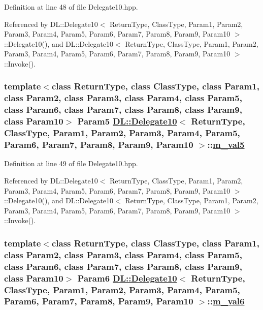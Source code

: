 Definition at line 48 of file Delegate10.hpp.

Referenced by DL::Delegate10$<$ Return\-Type, Class\-Type, Param1, Param2, Param3, Param4, Param5, Param6, Param7, Param8, Param9, Param10 $>$::Delegate10(), and DL::Delegate10$<$ Return\-Type, Class\-Type, Param1, Param2, Param3, Param4, Param5, Param6, Param7, Param8, Param9, Param10 $>$::Invoke().\hypertarget{classDL_1_1Delegate10_r6}{
\subsubsection[m\_\-val5]{\setlength{\rightskip}{0pt plus 5cm}template$<$class Return\-Type, class Class\-Type, class Param1, class Param2, class Param3, class Param4, class Param5, class Param6, class Param7, class Param8, class Param9, class Param10$>$ Param5 \hyperlink{classDL_1_1Delegate10}{DL::Delegate10}$<$ Return\-Type, Class\-Type, Param1, Param2, Param3, Param4, Param5, Param6, Param7, Param8, Param9, Param10 $>$::\hyperlink{classDL_1_1Delegate10_r6}{m\_\-val5}}}
\label{classDL_1_1Delegate10_r6}




Definition at line 49 of file Delegate10.hpp.

Referenced by DL::Delegate10$<$ Return\-Type, Class\-Type, Param1, Param2, Param3, Param4, Param5, Param6, Param7, Param8, Param9, Param10 $>$::Delegate10(), and DL::Delegate10$<$ Return\-Type, Class\-Type, Param1, Param2, Param3, Param4, Param5, Param6, Param7, Param8, Param9, Param10 $>$::Invoke().\hypertarget{classDL_1_1Delegate10_r7}{
\subsubsection[m\_\-val6]{\setlength{\rightskip}{0pt plus 5cm}template$<$class Return\-Type, class Class\-Type, class Param1, class Param2, class Param3, class Param4, class Param5, class Param6, class Param7, class Param8, class Param9, class Param10$>$ Param6 \hyperlink{classDL_1_1Delegate10}{DL::Delegate10}$<$ Return\-Type, Class\-Type, Param1, Param2, Param3, Param4, Param5, Param6, Param7, Param8, Param9, Param10 $>$::\hyperlink{classDL_1_1Delegate10_r7}{m\_\-val6}}}
\label{classDL_1_1Delegate10_r7}




